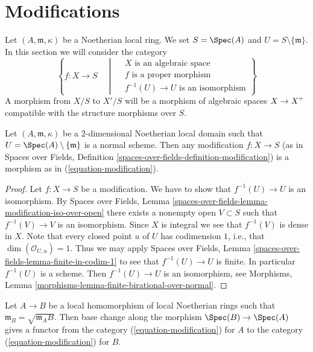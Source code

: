 \section{Modifications}
\label{section-modifications}

\noindent
Let $(A, \mathfrak m, \kappa)$ be a Noetherian local ring. We set
$S = \Spec(A)$ and $U = S \setminus \{\mathfrak m\}$. In this section
we will consider the category
\begin{equation}
\label{equation-modification}
\left\{
f : X \longrightarrow S
\quad \middle | \quad
\begin{matrix}
X\text{ is an algebraic space}\\
f\text{ is a proper morphism}\\
f^{-1}(U) \to U\text{ is an isomorphism}
\end{matrix}
\right\}
\end{equation}
A morphism from $X/S$ to $X'/S$ will be a morphism of algebraic spaces
$X \to X"$ compatible with the structure morphisms over $S$.

\begin{lemma}
\label{lemma-modification}
Let $(A, \mathfrak m, \kappa)$ be a $2$-dimensional Noetherian
local domain such that $U = \Spec(A) \setminus \{\mathfrak m\}$
is a normal scheme. Then any modification $f : X \to S$
(as in Spaces over Fields, Definition
\ref{spaces-over-fields-definition-modification})
is a morphism as in (\ref{equation-modification}).
\end{lemma}

\begin{proof}
Let $f : X \to S$ be a modification. We have to show that
$f^{-1}(U) \to U$ is an isomorphism. By
Spaces over Fields, Lemma
\ref{spaces-over-fields-lemma-modification-iso-over-open}
there exists a nonempty open $V \subset S$ such that $f^{-1}(V) \to V$
is an isomorphism. Since $X$ is integral we see that $f^{-1}(V)$ is
dense in $X$. Note that every closed point $u$ of $U$ has codimension
$1$, i.e., that $\dim(\mathcal{O}_{U, u}) = 1$. Thus we may apply
Spaces over Fields, Lemma \ref{spaces-over-fields-lemma-finite-in-codim-1}
to see that $f^{-1}(U) \to U$ is finite. In particular $f^{-1}(U)$ is a scheme.
Then $f^{-1}(U) \to U$ is an isomorphism, see
Morphisms, Lemma \ref{morphisms-lemma-finite-birational-over-normal}.
\end{proof}

\noindent
Let $A \to B$ be a local homomorphism of local Noetherian rings
such that $\mathfrak m_B = \sqrt{\mathfrak m_A B}$. Then base
change along the morphism $\Spec(B) \to \Spec(A)$ gives a functor
from the category (\ref{equation-modification}) for $A$
to the category (\ref{equation-modification}) for $B$.

